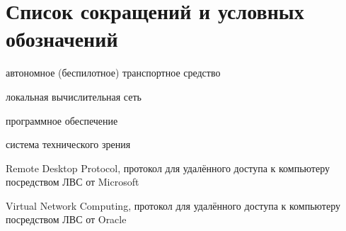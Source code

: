 \chapter*{Список сокращений и условных обозначений} %
\begin{description}[align=right,leftmargin=3.5cm]
\item[АТС] автономное (беспилотное) транспортное средство
\item[ЛВС] локальная вычислительная сеть
\item[ПО] программное обеспечение
\item[СТЗ] система технического зрения
\item[RDP] Remote Desktop Protocol, протокол для удалённого доступа к компьютеру посредством ЛВС от Microsoft
\item[VNC] Virtual Network Computing, протокол для удалённого доступа к компьютеру посредством ЛВС от Oracle
\end{description}
